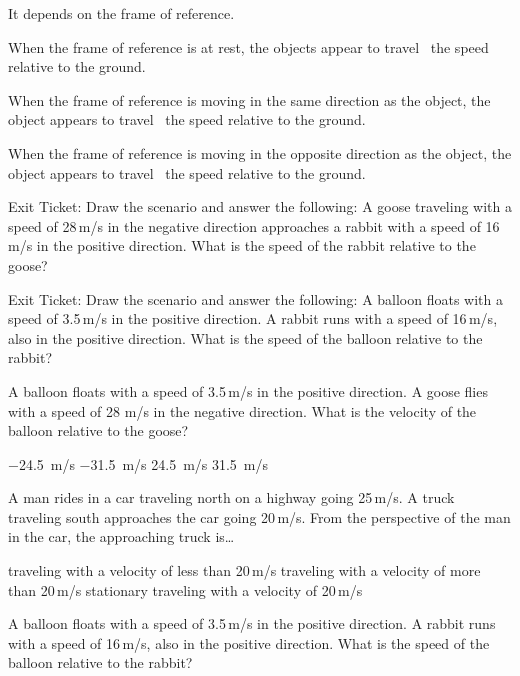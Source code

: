 \documentclass[answers]{exam}
\begin{document}
\begin{questions}
\begin{solution}
    It depends on the frame of reference.
\end{solution}


\question
When the frame of reference is at rest, the objects appear to travel \fillin[equal to]\ the speed relative to the ground.

\question
When the frame of reference is moving in the same direction as the object, the object appears to travel \ the speed relative to the ground.

\question
When the frame of reference is moving in the opposite direction as the object, the object appears to travel \ the speed relative to the ground.

\question
Exit Ticket: Draw the scenario and answer the following: A goose traveling with a speed of 28\,m/s in the negative direction approaches a rabbit with a speed of 16\,m/s in the positive direction. What is the speed of the rabbit relative to the goose?

\question
Exit Ticket:  Draw the scenario and answer the following: A balloon floats with a speed of 3.5\,m/s in the positive direction.  A rabbit runs with a speed of 16\,m/s, also in the positive direction.  What is the speed of the balloon relative to the rabbit?


\question
A balloon floats with a speed of 3.5\,m/s in the positive direction.  A goose flies with a speed of 28 m/s in the negative direction. What is the velocity of the balloon relative to the goose?

\begin{randomizechoices}
    \choice \SI{-24.5}{m/s}
    \choice \SI{-31.5}{m/s}
    \choice \SI{24.5}{m/s}
    \correctchoice \SI{31.5}{m/s}
\end{randomizechoices}

\question
A man rides in a car traveling north on a highway going 25\,m/s. A truck traveling south approaches the car going 20\,m/s. From the perspective of the man in the car, the approaching truck is\dots

\begin{randomizechoices}
    \choice traveling with a velocity of less than 20\,m/s
    \choice traveling with a velocity of more than 20\,m/s
    \choice stationary
    \choice traveling with a velocity of 20\,m/s
\end{randomizechoices}

\question
A balloon floats with a speed of 3.5\,m/s in the positive direction. A rabbit runs with a speed of 16\,m/s, also in the positive direction. What is the speed of the balloon relative to the rabbit?


\end{questions}
\end{document}
